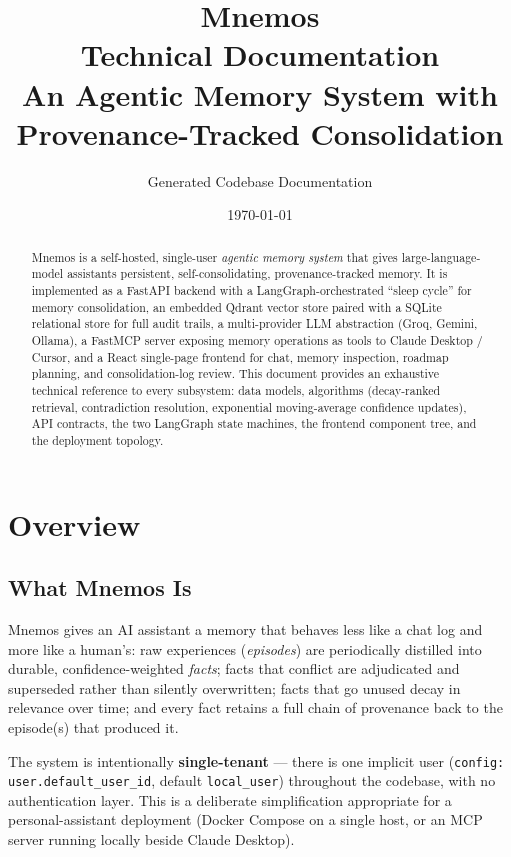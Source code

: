 \documentclass[11pt,a4paper]{report}
\title{
  {\Huge\bfseries Mnemos}\\[0.3cm]
  {\Large Technical Documentation}\\[0.2cm]
  {\large An Agentic Memory System with Provenance-Tracked Consolidation}
}
\author{Generated Codebase Documentation}
\date{\today}
\newcommand{\code}[1]{\texttt{\small #1}}
\begin{document}
\maketitle

\begin{abstract}
\noindent Mnemos is a self-hosted, single-user \emph{agentic memory system} that gives large-language-model assistants persistent, self-consolidating, provenance-tracked memory. It is implemented as a FastAPI backend with a LangGraph-orchestrated ``sleep cycle'' for memory consolidation, an embedded Qdrant vector store paired with a SQLite relational store for full audit trails, a multi-provider LLM abstraction (Groq, Gemini, Ollama), a FastMCP server exposing memory operations as tools to Claude Desktop / Cursor, and a React single-page frontend for chat, memory inspection, roadmap planning, and consolidation-log review. This document provides an exhaustive technical reference to every subsystem: data models, algorithms (decay-ranked retrieval, contradiction resolution, exponential moving-average confidence updates), API contracts, the two LangGraph state machines, the frontend component tree, and the deployment topology.
\end{abstract}

\tableofcontents

\chapter{Overview}

\section{What Mnemos Is}

Mnemos gives an AI assistant a memory that behaves less like a chat log and more like a human's: raw experiences (\emph{episodes}) are periodically distilled into durable, confidence-weighted \emph{facts}; facts that conflict are adjudicated and superseded rather than silently overwritten; facts that go unused decay in relevance over time; and every fact retains a full chain of provenance back to the episode(s) that produced it.

The system is intentionally \textbf{single-tenant} — there is one implicit user (\code{config: user.default\_user\_id}, default \code{local\_user}) throughout the codebase, with no authentication layer. This is a deliberate simplification appropriate for a personal-assistant deployment (Docker Compose on a single host, or an MCP server running locally beside Claude Desktop).
\end{document}
